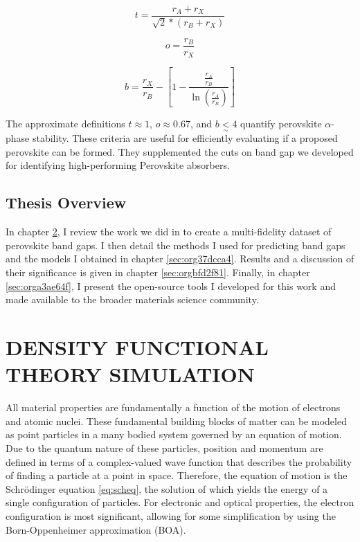 \begin{equation}
\label{eq:t}
t = \frac{r_A+r_X}{\sqrt{2}*(r_B+r_X)}
\end{equation}

\begin{equation}
\label{eq:o}
o=\frac{r_B}{r_X}
\end{equation}

\begin{equation}
\label{eq:b}
b = \frac{r_X}{r_B}-\left[ 1-\frac{\frac{r_A}{r_B}}{\ln(\frac{r_A}{r_B})} \right]
\end{equation}

The approximate definitions \(t \approx 1\), \(o \approx 0.67\), and \(b \underset{\sim}{<} 4\) quantify perovskite \(\alpha\)-phase stability.
\autocite{yin-2015-halid-perov,bartel-2019-new-toler}
These criteria are useful for efficiently evaluating if a proposed perovskite can be formed.
They supplemented the cuts on band gap we developed for identifying high-performing Perovskite absorbers.

\section{Thesis Overview}
\label{sec:org3722640}
In chapter \ref{sec:org44ac04c}, I review the work we did in \autocite{yang-2023-high-throug} to create a multi-fidelity dataset of perovskite band gaps.
I then detail the methods I used for predicting band gaps and the models I obtained in chapter \ref{sec:org37dcca4}.
Results and a discussion of their significance is given in chapter \ref{sec:orgbfd2f81}.
Finally, in chapter \ref{sec:orga3ae64f}, I present the open-source tools I developed for this work and made available to the broader materials science community.

\chapter{DENSITY FUNCTIONAL THEORY SIMULATION}
\label{sec:org44ac04c}
All material properties are fundamentally a function of the motion of electrons and atomic nuclei.
These fundamental building blocks of matter can be modeled as point particles in a many bodied system governed by an equation of motion.
Due to the quantum nature of these particles, position and momentum are defined in terms of a complex-valued wave function that describes the probability of finding a particle at a point in space.
Therefore, the equation of motion is the Schrödinger equation \eqref{eq:scheq}, the solution of which yields the energy of a single configuration of particles.
For electronic and optical properties, the electron configuration is most significant, allowing for some simplification by using the Born-Oppenheimer approximation (BOA).


